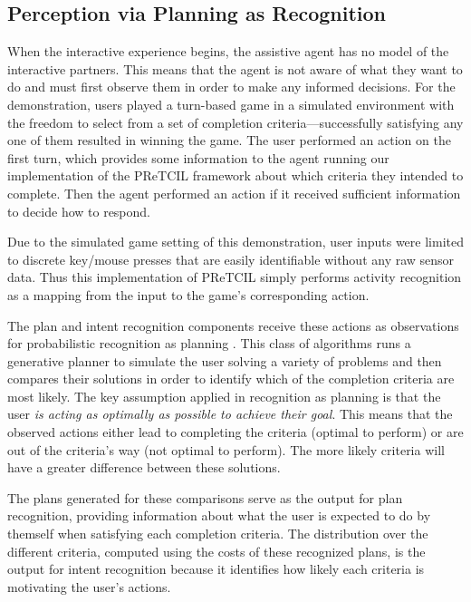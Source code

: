 \documentclass[letterpaper]{article} %
\begin{document}
\subsection{Perception via Planning as Recognition\label{sec:pretcil.perception}}
When the interactive experience begins, the assistive agent has no model of the interactive partners.  This means that the agent is not aware of what they want to do and must first observe them in order to make any informed decisions.  For the demonstration, users played a turn-based game in a simulated environment with the freedom to select from a set of completion criteria---successfully satisfying any one of them resulted in winning the game.  The user performed an action on the first turn, which provides some information to the agent running our implementation of the {\sc PReTCIL} framework about which criteria they intended to complete.  Then the agent performed an action if it received sufficient information to decide how to respond. %

Due to the simulated game setting of this demonstration, user inputs were limited to discrete key/mouse %
 presses that are easily identifiable without any raw sensor data.  Thus this implementation of {\sc PReTCIL}
 simply performs activity recognition as a mapping from the input to the game's corresponding action.

The plan and intent recognition components receive these actions as observations for probabilistic recognition as planning \cite{DBLP:conf/aaai/RamirezG10}.  This class of algorithms runs a generative planner to simulate the user solving a variety of problems and then compares their solutions in order to identify which of the completion criteria are most likely.  The key assumption applied in recognition as planning is that the user \textit{is acting as optimally as possible to achieve their goal}.  This means that %
the observed actions either lead to completing the criteria (optimal to perform) or are out of the criteria's way (not optimal to perform).  The more likely criteria will have a greater difference between these solutions. %

The plans generated for these comparisons serve as the output for plan recognition, providing information about what the user is expected to do by themself when satisfying each completion criteria.  The distribution over the different criteria, computed using the costs of these recognized plans, is the output for intent recognition because it identifies how likely each criteria is motivating the user's actions.
\end{document}
